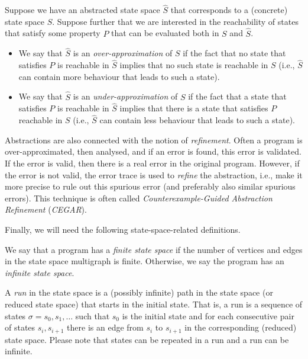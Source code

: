 \begin{definition}
  Suppose we have an abstracted state space $\widehat{S}$ that corresponds to a (concrete) state space $S$.
  Suppose further that we are interested in the reachability of states that satisfy some property $P$ that can be evaluated both in $S$ and $\widehat{S}$.
  \begin{itemize}
    \item We say that $\widehat{S}$ is an \emph{over-approximation} of $S$ if the fact that no state that satisfies $P$ is reachable in $\widehat{S}$ implies that no such state is reachable in $S$ (i.e., $\widehat{S}$ can contain more behaviour that leads to such a state).
    \item We say that $\widehat{S}$ is an \emph{under-approximation} of $S$ if the fact that a state that satisfies $P$ is reachable in $\widehat{S}$ implies that there is a state that satisfies $P$ reachable in $S$ (i.e., $\widehat{S}$ can contain less behaviour that leads to such a state).
    \end{itemize}
\end{definition}

Abstractions are also connected with the notion of \emph{refinement}.
Often a program is over-approximated, then analysed, and if an error is found, this error is validated.
If the error is valid, then there is a real error in the original program.
However, if the error is not valid, the error trace is used to \emph{refine} the abstraction, i.e., make it more precise to rule out this spurious error (and preferably also similar spurious errors).
This technique is often called \emph{Counterexample-Guided Abstraction Refinement} (\emph{CEGAR}).

\medskip
Finally, we will need the following state-space-related definitions.

\begin{definition}
We say that a program has a \emph{finite state space} if the number of vertices and edges in the state space multigraph is finite.
Otherwise, we say the program has an \emph{infinite state space}.
\end{definition}

\begin{definition}[Run]
A \emph{run} in the state space is a (possibly infinite) path in the state space (or reduced state space) that starts in the initial state.
That is, a run is a sequence of states $\sigma = s_0, s_1, …$ such that $s_0$ is the initial state and for each consecutive pair of states $s_i, s_{i+1}$ there is an edge from $s_i$ to $s_{i + 1}$ in the corresponding (reduced) state space.
Please note that states can be repeated in a run and a run can be infinite.
\end{definition}

